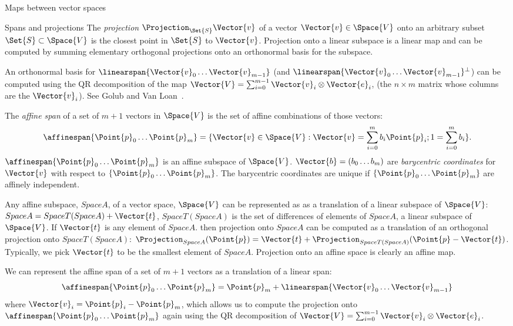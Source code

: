 \begin{plSection}{Maps between vector spaces}
\begin{plSection}{Spans and projections}
The {\it projection} $\Projection_{\Set{S}} \Vector{v}$ 
of a vector $\Vector{v} \in \Space{V}$
onto an arbitrary subset $\Set{S} \subset \Space{V}$
is the closest point in $\Set{S}$ to $\Vector{v}$.
Projection onto a linear subspace is a linear map and
can be computed by summing
elementary orthogonal projections onto an orthonormal basis 
for the subspace.

An orthonormal basis for 
$\linearspan\{ \Vector{v}_0 \ldots \Vector{v}_{m-1} \}$
(and $\linearspan\{ \Vector{v}_0 \ldots \Vector{v}_{m-1} \}^\perp$)
can be computed using the QR decomposition
of the map $\Vector{V} = \sum_{i=0}^{m-1} \Vector{v}_i \otimes \Vector{e}_i$,
(the $n \times m$ matrix whose columns are the $\Vector{v}_i$).
See Golub and Van Loan~\cite[sec.~5.2]{GolubVanLoan:1996}.

The {\it affine span} of a set of $m+1$ vectors in $\Space{V}$
is the set of affine combinations of those vectors:
\begin{equation}
\affinespan\{ \Point{p}_0 \ldots \Point{p}_{m} \} = \{\Vector{v} \in \Space{V} : \Vector{v} = \sum_{i=0}^{m} b_i \Point{p}_i;
1 = \sum_{i=0}^{m} b_i \}.
\end{equation}
$\affinespan\{ \Point{p}_0 \ldots \Point{p}_{m} \}$ 
is an affine subspace of $\Space{V}$.
$\Vector{b} = ( b_0 \ldots b_m )$ are {\it barycentric coordinates}
for $\Vector{v}$ with respect to 
$\{ \Point{p}_0 \ldots \Point{p}_{m} \}$.
The barycentric coordinates are unique if 
$\{ \Point{p}_0 \ldots \Point{p}_{m} \}$
are affinely independent.

Any affine subspace, $Space{A}$, of a vector space, $\Space{V}$ can be represented as
as a translation of a linear subspace of $\Space{V}$:
$Space{A} = Space{T}(Space{A}) + \Vector{t}$,
$Space{T}(Space{A})$ is the set of differences of elements of $Space{A}$,
a linear subspace of $\Space{V}$.
If $\Vector{t}$ is any element of $Space{A}$.
then projection onto $Space{A}$
can be computed as a translation of an orthogonal projection onto $Space{T}(Space{A})$:
$\Projection_{Space{A}} (\Point{p}) = \Vector{t} + \Projection_{Space{T}(Space{A})} (\Point{p} - \Vector{t})$.
Typically, we pick $\Vector{t}$ to be the smallest element of $Space{A}$.
Projection onto an affine space is clearly an affine map.

We can represent the affine span of a set of $m+1$ vectors
as a translation of a linear span:
\begin{equation}
\affinespan\{ \Point{p}_0 \ldots \Point{p}_{m} \} = 
\Point{p}_m + \linearspan\{\Vector{v}_0 \ldots \Vector{v}_{m-1}\}
\end{equation}
where $\Vector{v}_i = \Point{p}_i - \Point{p}_m$,
which allows us to compute the projection onto
$\affinespan\{ \Point{p}_0 \ldots \Point{p}_{m} \}$
again using the QR decomposition
of $\Vector{V} = \sum_{i=0}^{m-1} \Vector{v}_i \otimes \Vector{e}_i$.


\end{plSection}
\end{plSection}
